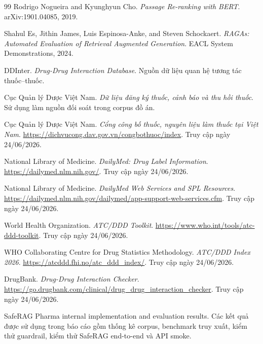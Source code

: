 \begin{thebibliography}{99}
Rodrigo Nogueira and Kyunghyun Cho. \textit{Passage Re-ranking with BERT}. arXiv:1901.04085, 2019.

Shahul Es, Jithin James, Luis Espinosa-Anke, and Steven Schockaert. \textit{RAGAs: Automated Evaluation of Retrieval Augmented Generation}. EACL System Demonstrations, 2024.

DDInter. \textit{Drug-Drug Interaction Database}. Nguồn dữ liệu quan hệ tương tác thuốc--thuốc.

Cục Quản lý Dược Việt Nam. \textit{Dữ liệu đăng ký thuốc, cảnh báo và thu hồi thuốc}. Sử dụng làm nguồn đối soát trong corpus đồ án.

Cục Quản lý Dược Việt Nam. \textit{Cổng công bố thuốc, nguyên liệu làm thuốc tại Việt Nam}. \url{https://dichvucong.dav.gov.vn/congbothuoc/index}. Truy cập ngày 24/06/2026.

National Library of Medicine. \textit{DailyMed: Drug Label Information}. \url{https://dailymed.nlm.nih.gov/}. Truy cập ngày 24/06/2026.

National Library of Medicine. \textit{DailyMed Web Services and SPL Resources}. \url{https://dailymed.nlm.nih.gov/dailymed/app-support-web-services.cfm}. Truy cập ngày 24/06/2026.

World Health Organization. \textit{ATC/DDD Toolkit}. \url{https://www.who.int/tools/atc-ddd-toolkit}. Truy cập ngày 24/06/2026.

WHO Collaborating Centre for Drug Statistics Methodology. \textit{ATC/DDD Index 2026}. \url{https://atcddd.fhi.no/atc_ddd_index/}. Truy cập ngày 24/06/2026.

DrugBank. \textit{Drug-Drug Interaction Checker}. \url{https://go.drugbank.com/clinical/drug_drug_interaction_checker}. Truy cập ngày 24/06/2026.

SafeRAG Pharma internal implementation and evaluation results. Các kết quả được sử dụng trong báo cáo gồm thống kê corpus, benchmark truy xuất, kiểm thử guardrail, kiểm thử SafeRAG end-to-end và API smoke.

\end{thebibliography}
